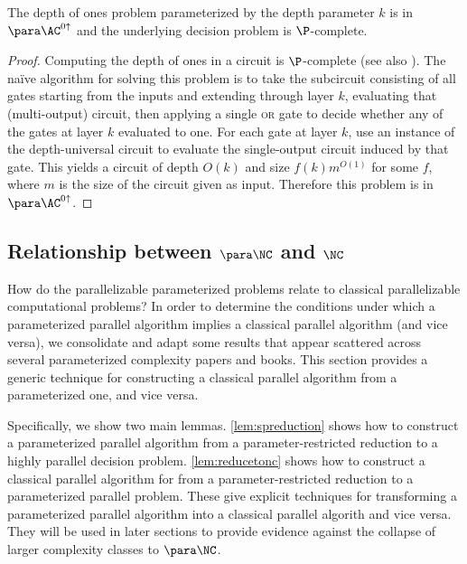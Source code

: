 \begin{theorem}\label{thm:onesdepth}
  The depth of ones problem parameterized by the depth parameter $k$ is in $\para \AC^{0 \uparrow}$ and the underlying decision problem is $\P$-complete.
\end{theorem}
\begin{proof}
  Computing the depth of ones in a circuit is $\P$-complete \autocite{ks88} (see also \autocite[Problem~A.1.10]{ghr95}).
  The naïve algorithm for solving this problem is to take the subcircuit consisting of all gates starting from the inputs and extending through layer $k$, evaluating that (multi-output) circuit, then applying a single \textsc{or} gate to decide whether any of the gates at layer $k$ evaluated to one.
  For each gate at layer $k$, use an instance of the depth-universal circuit to evaluate the single-output circuit induced by that gate.
  This yields a circuit of depth $O(k)$ and size $f(k) m^{O(1)}$ for some $f$, where $m$ is the size of the circuit given as input.
  Therefore this problem is in $\para \AC^{0\uparrow}$.
\end{proof}

\subsection{Relationship between \texorpdfstring{$\para \NC$}{paraNC} and \texorpdfstring{$\NC$}{NC}}

%
%
%
How do the parallelizable parameterized problems relate to classical parallelizable computational problems?
%
%
%
In order to determine the conditions under which a parameterized parallel algorithm implies a classical parallel algorithm (and vice versa),
%
%
%
we consolidate and adapt some results that appear scattered across several parameterized complexity papers and books.
%
%
%
This section provides a generic technique for constructing a classical parallel algorithm from a parameterized one, and vice versa.

%
%
%
Specifically, we show two main lemmas.
\autoref{lem:spreduction} shows how to construct a parameterized parallel algorithm from a parameter-restricted reduction to a highly parallel decision problem.
\autoref{lem:reducetonc} shows how to construct a classical parallel algorithm for from a parameter-restricted reduction to a parameterized parallel problem.
%
%
%
These give explicit techniques for transforming a parameterized parallel algorithm into a classical parallel algorith and vice versa.
%
%
They will be used in later sections to provide evidence against the collapse of larger complexity classes to $\para \NC$.

